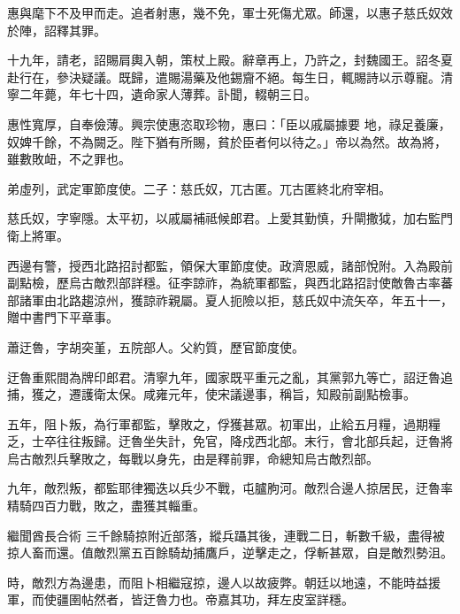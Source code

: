 \begin{pinyinscope}
 惠與麾下不及甲而走。追者射惠，幾不免，軍士死傷尤眾。師還，以惠子慈氏奴效於陣，詔釋其罪。



 十九年，請老，詔賜肩輿入朝，策杖上殿。辭章再上，乃許之，封魏國王。詔冬夏赴行在，參決疑議。既歸，遣賜湯藥及他錫齎不絕。每生日，輒賜詩以示尊寵。清寧二年薨，年七十四，遺命家人薄葬。訃聞，輟朝三日。



 惠性寬厚，自奉儉薄。興宗使惠恣取珍物，惠曰：「臣以戚屬據要
 地，祿足養廉，奴婢千餘，不為闕乏。陛下猶有所賜，貧於臣者何以待之。」帝以為然。故為將，雖數敗衄，不之罪也。



 弟虛列，武定軍節度使。二子：慈氏奴，兀古匿。兀古匿終北府宰相。



 慈氏奴，字寧隱。太平初，以戚屬補祗候郎君。上愛其勤慎，升閘撒狘，加右監門衛上將軍。



 西邊有警，授西北路招討都監，領保大軍節度使。政濟恩威，諸部悅附。入為殿前副點檢，歷烏古敵烈部詳穩。征李諒祚，為統軍都監，與西北路招討使敵魯古率蕃部諸軍由北路趨涼州，獲諒祚親屬。夏人扼險以拒，慈氏奴中流矢卒，年五十一，贈中書門下平章事。



 蕭迂魯，字胡突堇，五院部人。父約質，歷官節度使。



 迂魯重熙間為牌印郎君。清寧九年，國家既平重元之亂，其黨郭九等亡，詔迂魯追捕，獲之，遷護衛太保。咸雍元年，使宋議邊事，稱旨，知殿前副點檢事。



 五年，阻卜叛，為行軍都監，擊敗之，俘獲甚眾。初軍出，止給五月糧，過期糧乏，士卒往往叛歸。迂魯坐失計，免官，降戍西北部。末行，會北部兵起，迂魯將烏古敵烈兵擊敗之，每戰以身先，由是釋前罪，命總知烏古敵烈部。



 九年，敵烈叛，都監耶律獨迭以兵少不戰，屯臚朐河。敵烈合邊人掠居民，迂魯率精騎四百力戰，敗之，盡獲其輜重。



 繼聞酋長合術
 三千餘騎掠附近部落，縱兵躡其後，連戰二日，斬數千級，盡得被掠人畜而還。值敵烈黨五百餘騎劫捕鷹戶，逆擊走之，俘斬甚眾，自是敵烈勢沮。



 時，敵烈方為邊患，而阻卜相繼寇掠，邊人以故疲弊。朝廷以地遠，不能時益援軍，而使疆圉帖然者，皆迂魯力也。帝嘉其功，拜左皮室詳穩。




\end{pinyinscope}
